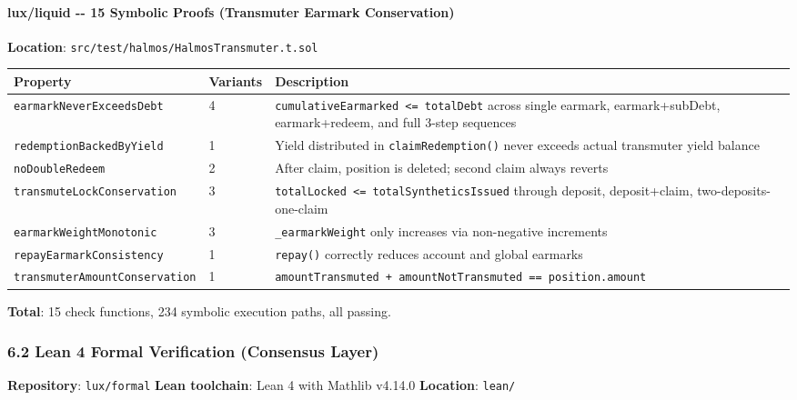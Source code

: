 \documentclass[
]{article}
\newcounter{none} %
\begin{document}
\paragraph{lux/liquid -\/- 15 Symbolic Proofs (Transmuter Earmark
Conservation)}\label{luxliquid----15-symbolic-proofs-transmuter-earmark-conservation}

\textbf{Location}: \texttt{src/test/halmos/HalmosTransmuter.t.sol}

{\def\LTcaptype{none} %
\begin{longtable}[]{@{}lll@{}}
\toprule\noalign{}
Property & Variants & Description \\
\midrule\noalign{}
\endhead
\bottomrule\noalign{}
\endlastfoot
\texttt{earmarkNeverExceedsDebt} & 4 &
\texttt{cumulativeEarmarked\ \textless{}=\ totalDebt} across single
earmark, earmark+subDebt, earmark+redeem, and full 3-step sequences \\
\texttt{redemptionBackedByYield} & 1 & Yield distributed in
\texttt{claimRedemption()} never exceeds actual transmuter yield
balance \\
\texttt{noDoubleRedeem} & 2 & After claim, position is deleted; second
claim always reverts \\
\texttt{transmuteLockConservation} & 3 &
\texttt{totalLocked\ \textless{}=\ totalSyntheticsIssued} through
deposit, deposit+claim, two-deposits-one-claim \\
\texttt{earmarkWeightMonotonic} & 3 & \texttt{\_earmarkWeight} only
increases via non-negative increments \\
\texttt{repayEarmarkConsistency} & 1 & \texttt{repay()} correctly
reduces account and global earmarks \\
\texttt{transmuterAmountConservation} & 1 &
\texttt{amountTransmuted\ +\ amountNotTransmuted\ ==\ position.amount} \\
\end{longtable}
}

\textbf{Total}: 15 check functions, 234 symbolic execution paths, all
passing.

\subsubsection{6.2 Lean 4 Formal Verification (Consensus
Layer)}\label{62-lean-4-formal-verification-consensus-layer}

\textbf{Repository}: \texttt{lux/formal} \textbf{Lean toolchain}: Lean 4
with Mathlib v4.14.0 \textbf{Location}: \texttt{lean/}
\end{document}
